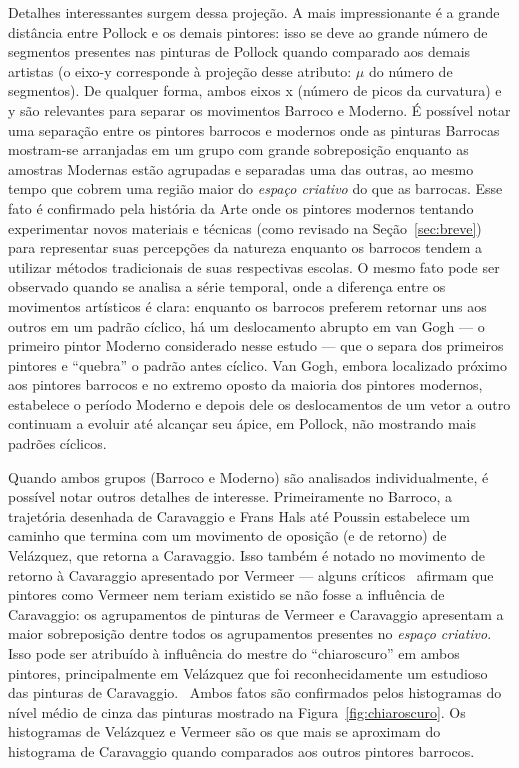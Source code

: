 Detalhes interessantes surgem dessa projeção. A mais impressionante é a grande
distância entre Pollock e os demais pintores: isso se deve ao grande número de
segmentos presentes nas pinturas de Pollock quando comparado aos demais artistas
(o eixo-y corresponde à projeção desse atributo: $\mu$ do número de
segmentos). De qualquer forma, ambos eixos x (número de picos da curvatura) e y
são relevantes para separar os movimentos Barroco e Moderno. É possível notar
uma separação entre os pintores barrocos e modernos onde as pinturas Barrocas
mostram-se arranjadas em um grupo com grande sobreposição enquanto as amostras
Modernas estão agrupadas e separadas uma das outras, ao mesmo tempo que cobrem
uma região maior do \textit{espaço criativo} do que as barrocas. Esse fato é
confirmado pela história da Arte onde os pintores modernos tentando experimentar
novos materiais e técnicas (como revisado na Seção~\ref{sec:breve}) para representar suas
percepções da natureza enquanto os barrocos tendem a utilizar métodos
tradicionais de suas respectivas escolas. O mesmo fato pode ser observado quando
se analisa a série temporal, onde a diferença entre os movimentos artísticos é
clara: enquanto os barrocos preferem retornar uns aos outros em um padrão
cíclico, há um deslocamento abrupto em van Gogh --- o primeiro pintor Moderno
considerado nesse estudo --- que o separa dos primeiros pintores e ``quebra'' o
padrão antes cíclico. Van Gogh, embora localizado próximo aos pintores barrocos
e no extremo oposto da maioria dos pintores modernos, estabelece o período
Moderno e depois dele os deslocamentos de um vetor a outro continuam a evoluir
até alcançar seu ápice, em Pollock, não mostrando mais padrões cíclicos.

Quando ambos grupos (Barroco e Moderno) são analisados individualmente, é
possível notar outros detalhes de interesse. Primeiramente no Barroco, a
trajetória desenhada de Caravaggio e Frans Hals até Poussin estabelece um
caminho que termina com um movimento de oposição (e de retorno) de
Vel\'{a}zquez, que retorna a Caravaggio.  Isso também é notado no movimento de
retorno à Cavaraggio apresentado por Vermeer --- alguns críticos~\cite{lambert}
afirmam que pintores como Vermeer nem teriam existido se não fosse a influência
de Caravaggio: os agrupamentos de pinturas de Vermeer e Caravaggio apresentam a
maior sobreposição dentre todos os agrupamentos presentes no \textit{espaço
  criativo}. Isso pode ser atribuído à influência do mestre do ``chiaroscuro''
em ambos pintores, principalmente em Vel\'{a}zquez que foi reconhecidamente um
estudioso das pinturas de Caravaggio.~\cite{gombrich} Ambos fatos são
confirmados pelos histogramas do nível médio de cinza das pinturas mostrado na
Figura~\ref{fig:chiaroscuro}. Os histogramas de Velázquez e Vermeer são os que
mais se aproximam do histograma de Caravaggio quando comparados aos outros
pintores barrocos.

